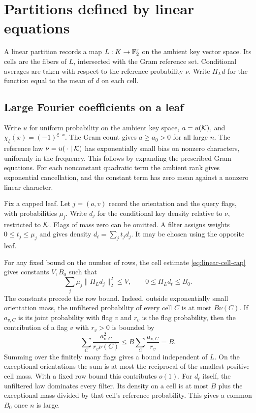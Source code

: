 \section{Partitions defined by linear equations}\label{sec:product-tests}

A linear partition records a map \(L:K\to\mathbb F_2^r\) on the ambient key
vector space. Its cells are the fibers of \(L\), intersected with the
Gram reference set. Conditional averages are taken with respect to the
reference probability \(\nu\). Write \(\Pi_L d\) for the function equal
to the mean of \(d\) on each cell.

\subsection{Large Fourier coefficients on a leaf}

Write \(u\) for uniform probability on the ambient key space,
\(a=u(\mathcal K)\), and \(\chi_\xi(x)=(-1)^{\xi\cdot x}\). The Gram count
gives \(a\ge a_0>0\) for all large \(n\). The reference law
\(\nu=u(\,\cdot\mid\mathcal K)\) has exponentially small bias on nonzero characters, uniformly in the
frequency. This follows by expanding the prescribed Gram equations.
For each nonconstant quadratic term the ambient rank gives exponential
cancellation, and the constant term has zero mean against a nonzero
linear character.

Fix a capped leaf. Let \(j=(o,v)\) record the orientation and the query
flags, with probabilities \(\mu_j\). Write \(d_j\) for the conditional key density
relative to \(\nu\), restricted to \(\mathcal K\). Flags of mass zero can be
omitted. A filter assigns weights \(0\le t_j\le\mu_j\) and gives density
\(d_t=\sum_j t_jd_j\). It may be chosen using the opposite leaf.

For any fixed bound on the number of rows, the cell estimate
\eqref{eq:linear-cell-cap} gives constants \(V,B_0\) such that
\begin{equation}\label{eq:linear-density-energy}
  \sum_j\mu_j\|\Pi_Ld_j\|_2^2\le V,\qquad 0\le\Pi_Ld_t\le B_0.
\end{equation}
The constants precede the row bound. Indeed, outside exponentially small
orientation mass, the unfiltered probability of every cell \(C\) is at
most \(B\nu(C)\). If \(a_{v,C}\) is its joint probability with flag
\(v\) and \(r_v\) is the flag probability, then
the contribution of a flag \(v\) with \(r_v>0\) is bounded by
\[
 \sum_C\frac{a_{v,C}^2}{r_v\nu(C)}
 \le B\sum_C\frac{a_{v,C}}{r_v}=B .
\]
Summing over the finitely many flags gives a bound independent of \(L\).
On the exceptional orientations the sum is at most the reciprocal of
the smallest positive cell mass. With a fixed row bound this contributes
\(o(1)\). For \(d_t\) itself, the unfiltered law dominates every filter.
Its density on a cell is at most \(B\) plus the exceptional mass
divided by that cell's reference probability. This gives a common
\(B_0\) once \(n\) is large.

